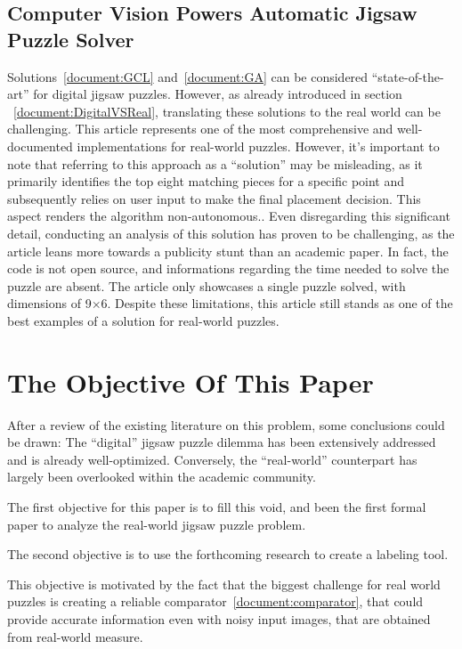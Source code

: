 \documentclass{article}
\begin{document}
\subsection{Computer Vision Powers Automatic Jigsaw Puzzle Solver~\cite{Abto}}
Solutions~\ref{document:GCL} and~\ref{document:GA} can be considered ``state-of-the-art''
for digital jigsaw puzzles.
However, as already introduced in section ~\ref{document:DigitalVSReal},
translating these solutions to the real world can be challenging.\newline
This article represents one of the most comprehensive and well-documented
implementations for real-world puzzles. However,
it's important to note that referring to this approach as a ``solution''
may be misleading, as it primarily identifies the top eight matching
pieces for a specific point and subsequently relies on user input to make
the final placement decision.
This aspect renders the algorithm non-autonomous..\newline
Even disregarding this significant detail,
conducting an analysis of this solution has proven to be challenging,
as the article leans more towards a publicity stunt than an academic paper.
In fact, the code is not open source, and informations regarding the time needed
to solve the puzzle are absent. The article only showcases a single puzzle solved,
with dimensions of 9\(\times\)6.\newline
Despite these limitations, this article still stands as one of the best examples of a solution
for real-world puzzles.

\section{The Objective Of This Paper}\label{document:objective}
After a review of the existing literature on this problem, some conclusions could be drawn:
The ``digital'' jigsaw puzzle dilemma has been extensively addressed and is already
well-optimized. Conversely, the ``real-world'' counterpart has largely been
overlooked within the academic community.

The first objective for this paper is to fill this void, and been the first formal paper
to analyze the real-world jigsaw puzzle problem.

The second objective is to use the forthcoming research to create a labeling tool.

This objective is motivated by the fact that the biggest challenge for real world puzzles is creating a
reliable comparator~\ref{document:comparator}, that could provide accurate information even with noisy 
input images, that are obtained from real-world measure.
\end{document}
